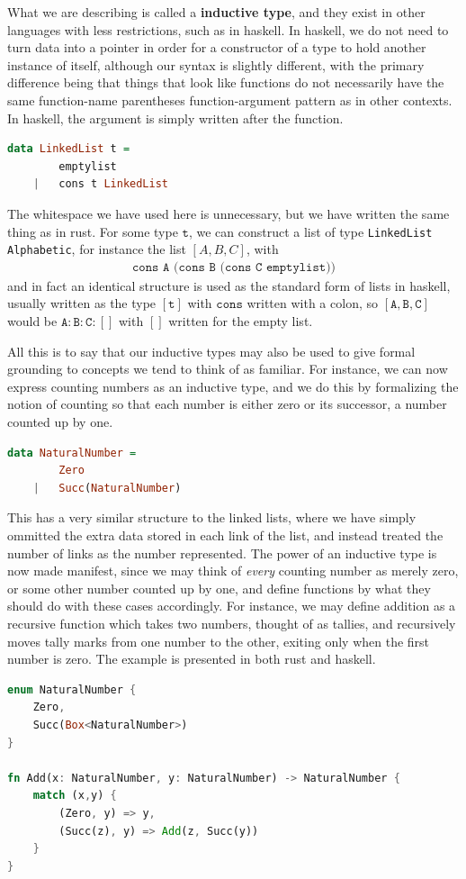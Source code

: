 \documentclass[11pt]{article}
\begin{document}
What we are describing is called a \textbf{inductive type}, and they exist in other languages with less restrictions, such as in haskell. In haskell, we do not need to turn data into a pointer in order for a constructor of a type to hold another instance of itself, although our syntax is slightly different, with the primary difference being that things that look like functions do not necessarily have the same function-name parentheses function-argument pattern as in other contexts. In haskell, the argument is simply written after the function.

\begin{lstlisting}[language=Haskell]
data LinkedList t =
		emptylist
	|	cons t LinkedList
\end{lstlisting}

The whitespace we have used here is unnecessary, but we have written the same thing as in rust. For some type $\mathtt{t}$, we can construct a list of type \texttt{LinkedList Alphabetic}, for instance the list $[A,B,C]$, with \begin{gather*}
\texttt{cons A (cons B (cons C emptylist))}
\end{gather*}
and in fact an identical structure is used as the standard form of lists in haskell, usually written as the type $\mathtt{[t]}$ with $\mathtt{cons}$ written with a colon, so $\mathtt{[A,B,C]}$ would be $\mathtt{A:B:C:[]}$ with $\mathtt{[]}$ written for the empty list.

All this is to say that our inductive types may also be used to give formal grounding to concepts we tend to think of as familiar. For instance, we can now express counting numbers as an inductive type, and we do this by formalizing the notion of counting so that each number is either zero or its successor, a number counted up by one. \begin{lstlisting}[language=Haskell]
data NaturalNumber =
		Zero
	|	Succ(NaturalNumber)
\end{lstlisting}
This has a very similar structure to the linked lists, where we have simply ommitted the extra data stored in each link of the list, and instead treated the number of links as the number represented. The power of an inductive type is now made manifest, since we may think of \emph{every} counting number as merely zero, or some other number counted up by one, and define functions by what they should do with these cases accordingly. For instance, we may define addition as a recursive function which takes two numbers, thought of as tallies, and recursively moves tally marks from one number to the other, exiting only when the first number is zero. The example is presented in both rust and haskell. \begin{lstlisting}[language=Rust]
enum NaturalNumber {
	Zero,
	Succ(Box<NaturalNumber>)
}

fn Add(x: NaturalNumber, y: NaturalNumber) -> NaturalNumber {
	match (x,y) {
		(Zero, y) => y,
		(Succ(z), y) => Add(z, Succ(y)) 
	}
} 
\end{lstlisting}
\end{document}
